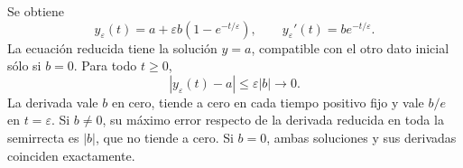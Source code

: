 Se obtiene
\[
y_\varepsilon(t)=a+\varepsilon b(1-e^{-t/\varepsilon}),\qquad
 y_\varepsilon'(t)=b e^{-t/\varepsilon}.
\]
La ecuación reducida tiene la solución \(y=a\), compatible con el otro dato inicial sólo si \(b=0\). Para todo \(t\ge0\),
\[
|y_\varepsilon(t)-a|\le\varepsilon|b|\longrightarrow0.
\]
La derivada vale \(b\) en cero, tiende a cero en cada tiempo positivo fijo y vale \(b/e\) en \(t=\varepsilon\). Si \(b\ne0\), su máximo error respecto de la derivada reducida en toda la semirrecta es \(|b|\), que no tiende a cero. Si \(b=0\), ambas soluciones y sus derivadas coinciden exactamente.
